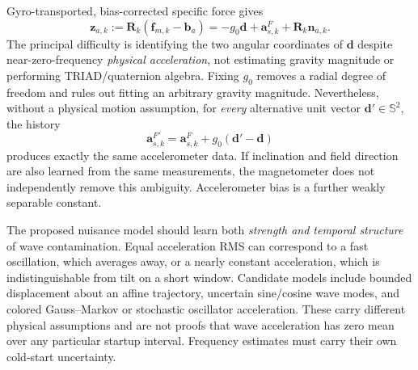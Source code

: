 \documentclass[conference]{IEEEtran}
\DeclareRobustCommand{\vct}[1]{\bm{#1}}
\DeclareRobustCommand{\mat}[1]{\bm{#1}}
\begin{document}
Gyro-transported, bias-corrected specific force gives
\begin{equation}
\vct z_{a,k}:=\mat R_k(\vct f_{m,k}-\vct b_a)
 =-g_0\vct d+\vct a_{s,k}^F+\mat R_k\vct n_{a,k}.
\label{eq:joint-transport-acc}
\end{equation}
The principal difficulty is identifying the two angular
coordinates of $\vct d$ despite near-zero-frequency
\emph{physical acceleration}, not estimating gravity magnitude
or performing TRIAD/quaternion algebra.  Fixing $g_0$ removes a
radial degree of freedom and rules out fitting an arbitrary
gravity magnitude.  Nevertheless, without a physical motion
assumption, for \emph{every} alternative unit vector
$\vct d'\in\mathbb S^2$, the history
\begin{equation}
\vct a_{s,k}^{F\prime}
 =\vct a_{s,k}^F+g_0(\vct d'-\vct d)
\label{eq:joint-gravity-gauge}
\end{equation}
produces exactly the same accelerometer data.  If inclination and field
direction are also learned from the same measurements, the
magnetometer does not independently remove this ambiguity.
Accelerometer bias is a further weakly separable constant.

The proposed nuisance model should learn both \emph{strength and
temporal structure} of wave contamination.  Equal acceleration RMS
can correspond to a fast oscillation, which averages away, or a
nearly constant acceleration, which is indistinguishable from tilt
on a short window.  Candidate models include bounded displacement
about an affine trajectory, uncertain sine/cosine wave modes, and
colored Gauss--Markov or stochastic oscillator acceleration.  These
carry different physical assumptions and are not proofs that wave
acceleration has zero mean over any particular startup interval.
Frequency estimates must carry their own cold-start uncertainty.
\end{document}
